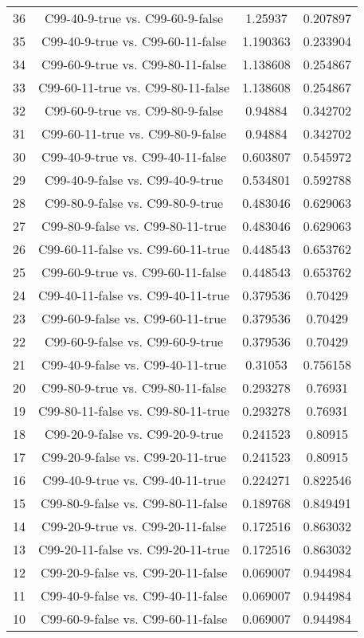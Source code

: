 \documentclass[a4paper,10pt]{article}
\begin{document}
\begin{landscape}
\begin{table}[!htp]
\begin{tabular}{cccc}
36&C99-40-9-true vs. C99-60-9-false&1.25937&0.207897\\
35&C99-40-9-true vs. C99-60-11-false&1.190363&0.233904\\
34&C99-60-9-true vs. C99-80-11-false&1.138608&0.254867\\
33&C99-60-11-true vs. C99-80-11-false&1.138608&0.254867\\
32&C99-60-9-true vs. C99-80-9-false&0.94884&0.342702\\
31&C99-60-11-true vs. C99-80-9-false&0.94884&0.342702\\
30&C99-40-9-true vs. C99-40-11-false&0.603807&0.545972\\
29&C99-40-9-false vs. C99-40-9-true&0.534801&0.592788\\
28&C99-80-9-false vs. C99-80-9-true&0.483046&0.629063\\
27&C99-80-9-false vs. C99-80-11-true&0.483046&0.629063\\
26&C99-60-11-false vs. C99-60-11-true&0.448543&0.653762\\
25&C99-60-9-true vs. C99-60-11-false&0.448543&0.653762\\
24&C99-40-11-false vs. C99-40-11-true&0.379536&0.70429\\
23&C99-60-9-false vs. C99-60-11-true&0.379536&0.70429\\
22&C99-60-9-false vs. C99-60-9-true&0.379536&0.70429\\
21&C99-40-9-false vs. C99-40-11-true&0.31053&0.756158\\
20&C99-80-9-true vs. C99-80-11-false&0.293278&0.76931\\
19&C99-80-11-false vs. C99-80-11-true&0.293278&0.76931\\
18&C99-20-9-false vs. C99-20-9-true&0.241523&0.80915\\
17&C99-20-9-false vs. C99-20-11-true&0.241523&0.80915\\
16&C99-40-9-true vs. C99-40-11-true&0.224271&0.822546\\
15&C99-80-9-false vs. C99-80-11-false&0.189768&0.849491\\
14&C99-20-9-true vs. C99-20-11-false&0.172516&0.863032\\
13&C99-20-11-false vs. C99-20-11-true&0.172516&0.863032\\
12&C99-20-9-false vs. C99-20-11-false&0.069007&0.944984\\
11&C99-40-9-false vs. C99-40-11-false&0.069007&0.944984\\
10&C99-60-9-false vs. C99-60-11-false&0.069007&0.944984\\

\end{tabular}
\end{table}
\end{landscape}
\end{document}
